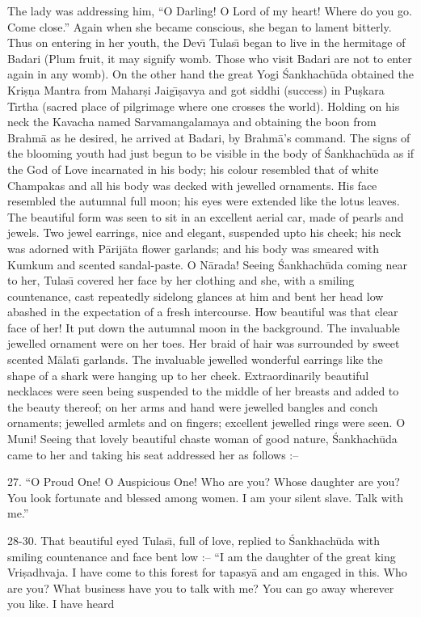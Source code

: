 The lady was addressing him, ``O Darling! O Lord of my heart! Where do you go. Come close.'' Again when she became conscious, she began to lament bitterly. Thus on entering in her youth, the Dev\={\i} Tulas\={\i} began to live in the hermitage of Badari (Plum fruit, it may signify womb. Those who visit Badari are not to enter again in any womb). On the other hand the great Yogi \'Sankhach\=uda obtained the Kri\d{s}\d{n}a Mantra from Mahar\d{s}i Jaig\={\i}\d{s}avya and got siddhi (success) in Pu\d{s}kara T\={\i}rtha (sacred place of pilgrimage where one crosses the world). Holding on his neck the Kavacha named Sarvamangalamaya and obtaining the boon from Brahm\=a as he desired, he arrived at Badari, by Brahm\=a's command. The signs of the blooming youth had just begun to be visible in the body of \'Sankhach\=uda as if the God of Love incarnated in his body; his colour resembled that of white Champakas and all his body was decked with jewelled ornaments. His face resembled the autumnal full moon; his eyes were extended like the lotus leaves. The beautiful form was seen to sit in an excellent aerial car, made of pearls and jewels. Two jewel earrings, nice and elegant, suspended upto his cheek; his neck was adorned with P\=arij\=ata flower garlands; and his body was smeared with Kumkum and scented sandal-paste. O N\=arada! Seeing \'Sankhach\=uda coming near to her, Tulas\={\i} covered her face by her clothing and she, with a smiling countenance, cast repeatedly sidelong glances at him and bent her head low abashed in the expectation of a fresh intercourse. How beautiful was that clear face of her! It put down the autumnal moon in the background. The invaluable jewelled ornament were on her toes. Her braid of hair was surrounded by sweet scented M\=alat\={\i} garlands. The invaluable jewelled wonderful earrings like the shape of a shark were hanging up to her cheek. Extraordinarily beautiful necklaces were seen being suspended to the middle of her breasts and added to the beauty thereof; on her arms and hand were jewelled bangles and conch ornaments; jewelled armlets and on fingers; excellent jewelled rings were seen. O Muni! Seeing that lovely beautiful chaste woman of good nature, \'Sankhach\=uda came to her and taking his seat addressed her as follows :--

27. ``O Proud One! O Auspicious One! Who are you? Whose daughter are you? You look fortunate and blessed among women. I am your silent slave. Talk with me.''

28-30. That beautiful eyed Tulas\={\i}, full of love, replied to \'Sankhach\=uda with smiling countenance and face bent low :-- ``I am the daughter of the great king Vri\d{s}adhvaja. I have come to this forest for tapasy\=a and am engaged in this. Who are you? What business have you to talk with me? You can go away wherever you like. I have heard

